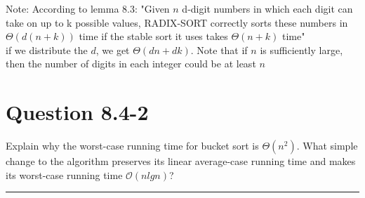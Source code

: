 \documentclass[20pt]{article} %
\begin{document}
Note: According to lemma 8.3: "Given $n$ d-digit numbers in which each digit can take on up to k possible values, RADIX-SORT correctly sorts these numbers in $\Theta(d(n+k))$ time if the stable sort it uses takes $\Theta(n+k)$ time" \\

if we distribute the $d$, we get $\Theta(dn+dk)$. Note that if $n$ is sufficiently large, then the number of digits in each integer could be at least $n$


\section{Question 8.4-2}
Explain why the worst-case running time for bucket sort is $\Theta(n^{2})$. What simple change to the algorithm preserves its linear average-case running time and makes its worst-case running time $\mathcal{O}(nlgn)$? \\ 
\noindent\rule{2cm}{0.4pt} \\ \\
\end{document}
